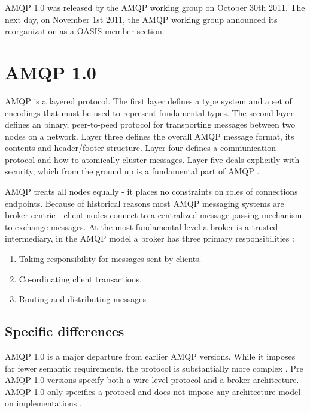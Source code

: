 \documentclass{thesis}
\begin{document}
AMQP 1.0 was released by the AMQP working group on October 30th 2011.  The next day, on November 1st 2011, the AMQP working group announced its reorganization as a OASIS member section. \cite{AMQP}

\section{AMQP 1.0}

AMQP is a layered protocol.  The first layer defines a type system and a set of encodings that must be used to represent fundamental types.  The second layer defines an binary, peer-to-peed protocol for transporting messages between two nodes on a network.  Layer three defines the overall AMQP message format, its contents and header/footer structure.  Layer four defines a communication protocol and how to atomically cluster messages.  Layer five deals explicitly with security, which from the ground up is a fundamental part of AMQP \cite{AMQP1.0}. 


AMQP treats all nodes equally - it places no constraints on roles of connections endpoints.   Because of historical reasons most AMQP messaging systems are broker centric - client nodes connect to a centralized message passing mechanism to exchange messages.  At the most fundamental level a broker is a trusted intermediary, in the AMQP model a broker has three primary responsibilities \cite{UNKNOWN}:


\begin{enumerate}
\item Taking responsibility for messages sent by clients.
\item Co-ordinating client transactions.
\item Routing and distributing messages 
\end{enumerate}


\subsection {Specific differences}

AMQP 1.0 is a major departure from earlier AMQP versions.  While it imposes far fewer semantic requirements, the protocol is substantially more complex \cite{RABBITMQ_PROTOCOLS}.  Pre AMQP 1.0 versions specify both a  wire-level protocol and a broker architecture.  AMQP 1.0 only specifies a protocol and does not impose any architecture model on implementations \cite{REDHAT1}.
\end{document}

